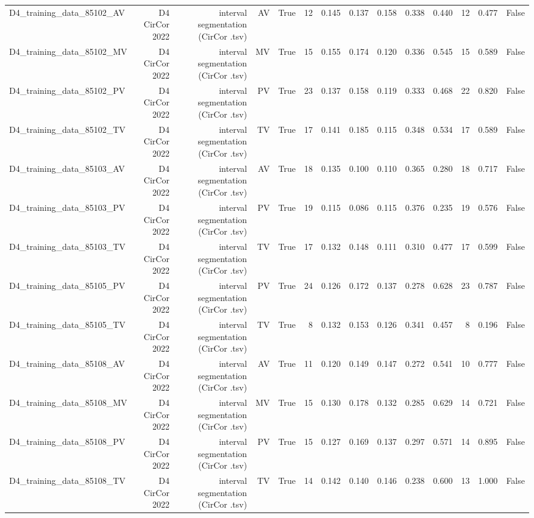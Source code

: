 \begin{table}[htbp]
\begin{tabular}{lrrrrrrrrrrrrr}
    D4\_training\_data\_85102\_AV & D4 CirCor 2022 & interval segmentation (CirCor .tsv) & AV & True & 12 & 0.145 & 0.137 & 0.158 & 0.338 & 0.440 & 12 & 0.477 & False \\
    D4\_training\_data\_85102\_MV & D4 CirCor 2022 & interval segmentation (CirCor .tsv) & MV & True & 15 & 0.155 & 0.174 & 0.120 & 0.336 & 0.545 & 15 & 0.589 & False \\
    D4\_training\_data\_85102\_PV & D4 CirCor 2022 & interval segmentation (CirCor .tsv) & PV & True & 23 & 0.137 & 0.158 & 0.119 & 0.333 & 0.468 & 22 & 0.820 & False \\
    D4\_training\_data\_85102\_TV & D4 CirCor 2022 & interval segmentation (CirCor .tsv) & TV & True & 17 & 0.141 & 0.185 & 0.115 & 0.348 & 0.534 & 17 & 0.589 & False \\
    D4\_training\_data\_85103\_AV & D4 CirCor 2022 & interval segmentation (CirCor .tsv) & AV & True & 18 & 0.135 & 0.100 & 0.110 & 0.365 & 0.280 & 18 & 0.717 & False \\
    D4\_training\_data\_85103\_PV & D4 CirCor 2022 & interval segmentation (CirCor .tsv) & PV & True & 19 & 0.115 & 0.086 & 0.115 & 0.376 & 0.235 & 19 & 0.576 & False \\
    D4\_training\_data\_85103\_TV & D4 CirCor 2022 & interval segmentation (CirCor .tsv) & TV & True & 17 & 0.132 & 0.148 & 0.111 & 0.310 & 0.477 & 17 & 0.599 & False \\
    D4\_training\_data\_85105\_PV & D4 CirCor 2022 & interval segmentation (CirCor .tsv) & PV & True & 24 & 0.126 & 0.172 & 0.137 & 0.278 & 0.628 & 23 & 0.787 & False \\
    D4\_training\_data\_85105\_TV & D4 CirCor 2022 & interval segmentation (CirCor .tsv) & TV & True & 8 & 0.132 & 0.153 & 0.126 & 0.341 & 0.457 & 8 & 0.196 & False \\
    D4\_training\_data\_85108\_AV & D4 CirCor 2022 & interval segmentation (CirCor .tsv) & AV & True & 11 & 0.120 & 0.149 & 0.147 & 0.272 & 0.541 & 10 & 0.777 & False \\
    D4\_training\_data\_85108\_MV & D4 CirCor 2022 & interval segmentation (CirCor .tsv) & MV & True & 15 & 0.130 & 0.178 & 0.132 & 0.285 & 0.629 & 14 & 0.721 & False \\
    D4\_training\_data\_85108\_PV & D4 CirCor 2022 & interval segmentation (CirCor .tsv) & PV & True & 15 & 0.127 & 0.169 & 0.137 & 0.297 & 0.571 & 14 & 0.895 & False \\
    D4\_training\_data\_85108\_TV & D4 CirCor 2022 & interval segmentation (CirCor .tsv) & TV & True & 14 & 0.142 & 0.140 & 0.146 & 0.238 & 0.600 & 13 & 1.000 & False \\

\end{tabular}
\end{table}
